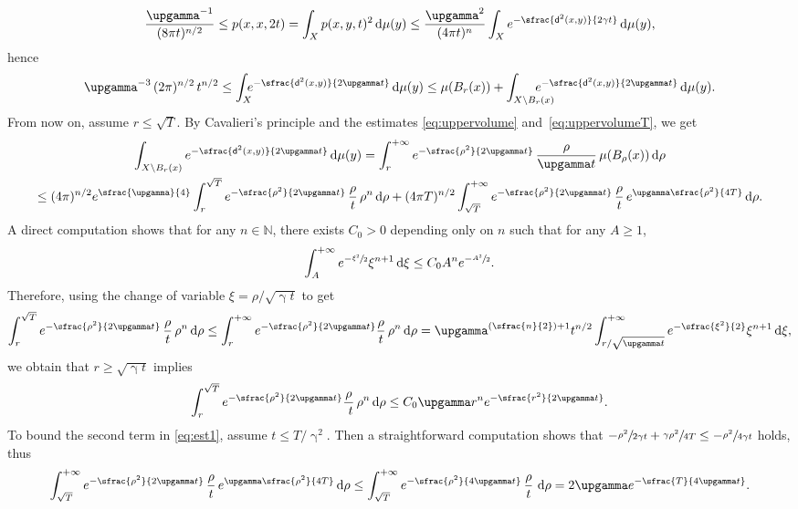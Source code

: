 \documentclass[10pt]{amsart}
\newcommand{\Psfrac}[2]{(\sfrac{#1}{#2})}
\theoremstyle{plain}
\theoremstyle{definition}
\newcommand{\setN}{\mathbb{N}}
\newcommand{\di}{\mathop{}\!\mathrm{d}}
\newcommand{\dist}{\mathsf{d}}
\begin{document}
\[
\frac{\upgamma^{-1}}{(8\pi t)^{n/2}} \le p(x,x,2t) = \int_X p(x,y,t)^2 \di \mu(y) \le \frac{\upgamma^2}{(4 \pi t)^n} \int_X e^{-\sfrac{\dist^2(x,y)}{2 \gamma t}} \di \mu(y),
\]
hence
\begin{equation}\label{eq:est4}
\upgamma^{-3}\,(2\pi)^{n/2}\, t^{n/2} \le \int_X \hspace*{-2mm}e^{-\sfrac{\dist^2(x,y)}{2\upgamma t}}\di\mu(y) \le \mu(B_r(x))+\int_{X\setminus B_r(x)}\hspace*{-6mm} e^{-\sfrac{\dist^2(x,y)}{2\upgamma t}}\di\mu(y).
\end{equation}
From now on, assume $r \le \sqrt{T}$. By Cavalieri's principle and the estimates \eqref{eq:uppervolume} and~\eqref{eq:uppervolumeT}, we get
\begin{multline}\label{eq:est1}
\int_{X\setminus B_r(x)} e^{-\sfrac{\dist^2(x,y)}{2\upgamma t}}\di\mu(y)=\int_r^{+\infty} e^{-\sfrac{\rho^2}{2\upgamma t}}\,\frac{\rho}{\upgamma t}\,\mu(B_\rho(x))\di\rho\\
\le (4 \pi)^{n/2}e^{\sfrac{\upgamma}{4}} \int_r^{\sqrt{T}} e^{-\sfrac{\rho^2}{2\upgamma t}}\,\frac{\rho}{ t} \, \rho^n \di \rho+(4 \pi T)^{n/2}\int_{\sqrt{T}}^{+\infty} e^{-\sfrac{\rho^2}{2\upgamma t}}\,\frac{\rho}{ t}\, e^{\upgamma\sfrac{\rho^2}{4T}}\di\rho.
\end{multline}
A direct computation shows that for any $n \in \setN$, there exists $C_0>0$ depending only on $n$ such that for any $A\ge 1$,
\[
\int_A^{+\infty} e^{-\sfrac{\xi^2}{2}} \xi^{n+1} \di \xi \le C_0 A^n e^{-\sfrac{A^2}{2}}.
\]
Therefore, using the change of variable $\xi= \rho/\sqrt{\upgamma t}$ to get
\[
\int_r^{\sqrt{T}} e^{-\sfrac{\rho^2}{2\upgamma t}}\,\frac{\rho}{ t}\, \rho^n \di \rho\le \int_r^{+\infty} e^{-\sfrac{\rho^2}{2\upgamma t}}\frac{\rho}{ t}\, \rho^n \di\rho = \upgamma^{\Psfrac n2+1} t ^{n/2} \int_{r/\sqrt{\upgamma t}}^{+\infty} e^{-\sfrac{\xi^2}{2}}\xi^{n+1} \di \xi,
\]
we obtain that $r\ge \sqrt{\upgamma t}$ implies
\begin{equation}\label{eq:est2} \int_r^{\sqrt{T}} e^{-\sfrac{\rho^2}{2\upgamma t}}\frac{\rho}{\ t}\, \rho^n \di \rho\le C_0 \upgamma r^n e^{-\sfrac{r^2}{2\upgamma t}}.
\end{equation}
To bound the second term in \eqref{eq:est1}, assume $t\le T/\upgamma^2$. Then a straightforward computation shows that $-\sfrac{\rho^2}{2\gamma t} + \sfrac{\gamma \rho^2}{4T} \le - \sfrac{\rho^2}{4 \gamma t}$ holds, thus
\begin{equation}\label{eq:est3}
\int_{\sqrt{T}}^{+\infty} e^{-\sfrac{\rho^2}{2\upgamma t}}\,\frac{\rho}{ t}\, e^{\upgamma\sfrac{\rho^2}{4T}}\di \rho \le \int_{\sqrt{T}}^{+\infty} e^{-\sfrac{\rho^2}{4\upgamma t}}\,\frac{\rho}{ t}\, \di \rho = 2\upgamma e^{-\sfrac{T}{4\upgamma t}}.
\end{equation}
\end{document}
